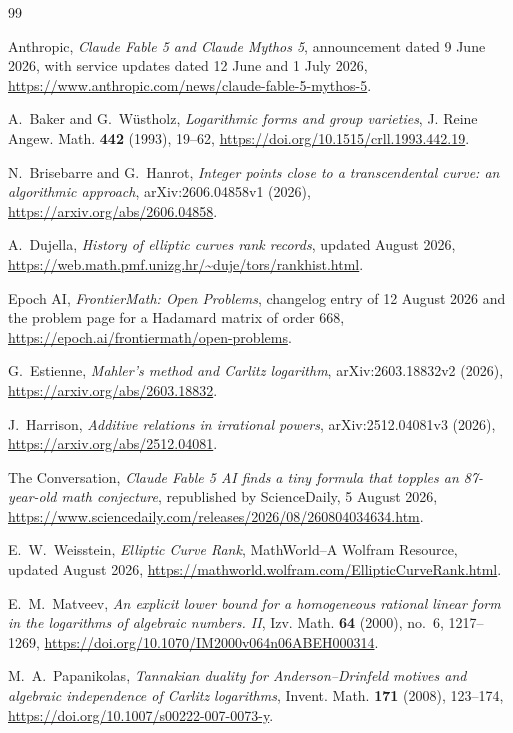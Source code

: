 \documentclass[11pt,oneside]{article}
\theoremstyle{definition}
\theoremstyle{remark}
\begin{document}
\begin{thebibliography}{99}

Anthropic,
\emph{Claude Fable 5 and Claude Mythos 5},
announcement dated 9 June 2026, with service updates dated 12 June and 1 July 2026,
\url{https://www.anthropic.com/news/claude-fable-5-mythos-5}.

A.~Baker and G.~W\"ustholz,
\emph{Logarithmic forms and group varieties},
J. Reine Angew. Math. \textbf{442} (1993), 19--62,
\url{https://doi.org/10.1515/crll.1993.442.19}.

N.~Brisebarre and G.~Hanrot,
\emph{Integer points close to a transcendental curve: an algorithmic approach},
arXiv:2606.04858v1 (2026),
\url{https://arxiv.org/abs/2606.04858}.

A.~Dujella,
\emph{History of elliptic curves rank records},
updated August 2026,
\url{https://web.math.pmf.unizg.hr/~duje/tors/rankhist.html}.

Epoch AI,
\emph{FrontierMath: Open Problems},
changelog entry of 12 August 2026 and the problem page for a Hadamard matrix of order $668$,
\url{https://epoch.ai/frontiermath/open-problems}.

G.~Estienne,
\emph{Mahler's method and Carlitz logarithm},
arXiv:2603.18832v2 (2026),
\url{https://arxiv.org/abs/2603.18832}.

J.~Harrison,
\emph{Additive relations in irrational powers},
arXiv:2512.04081v3 (2026),
\url{https://arxiv.org/abs/2512.04081}.

The Conversation,
\emph{Claude Fable 5 AI finds a tiny formula that topples an 87-year-old math conjecture},
republished by ScienceDaily, 5 August 2026,
\url{https://www.sciencedaily.com/releases/2026/08/260804034634.htm}.

E.~W.~Weisstein,
\emph{Elliptic Curve Rank},
MathWorld--A Wolfram Resource, updated August 2026,
\url{https://mathworld.wolfram.com/EllipticCurveRank.html}.

E.~M.~Matveev,
\emph{An explicit lower bound for a homogeneous rational linear form in the logarithms of
algebraic numbers. II},
Izv. Math. \textbf{64} (2000), no.~6, 1217--1269,
\url{https://doi.org/10.1070/IM2000v064n06ABEH000314}.

M.~A.~Papanikolas,
\emph{Tannakian duality for Anderson--Drinfeld motives and algebraic independence of Carlitz
logarithms},
Invent. Math. \textbf{171} (2008), 123--174,
\url{https://doi.org/10.1007/s00222-007-0073-y}.

\end{thebibliography}
\end{document}
